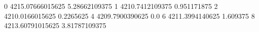 0 4215.07666015625 5.28662109375
1 4210.7412109375 0.951171875
2 4210.0166015625 0.2265625
4 4209.7900390625 0.0
6 4211.3994140625 1.609375
8 4213.60791015625 3.81787109375
